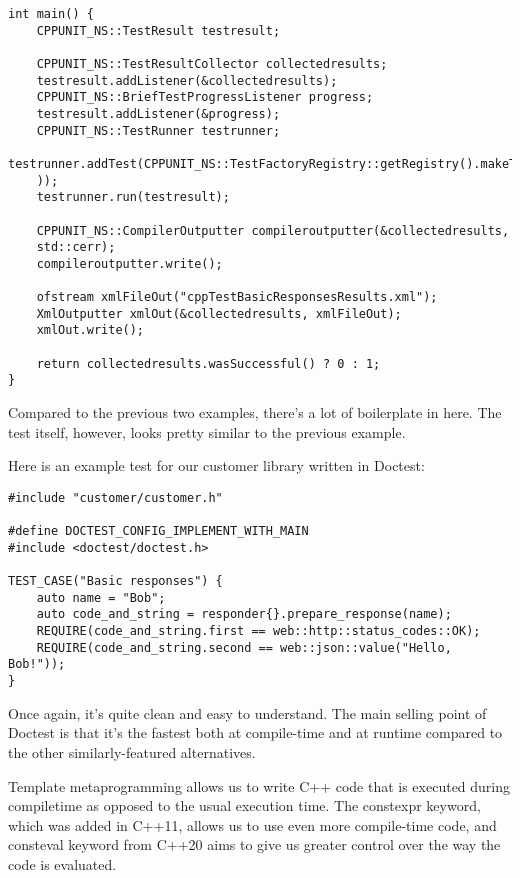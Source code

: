 \begin{lstlisting}[style=styleCXX]
int main() {
	CPPUNIT_NS::TestResult testresult;
	
	CPPUNIT_NS::TestResultCollector collectedresults;
	testresult.addListener(&collectedresults);
	CPPUNIT_NS::BriefTestProgressListener progress;
	testresult.addListener(&progress);
	CPPUNIT_NS::TestRunner testrunner;
	testrunner.addTest(CPPUNIT_NS::TestFactoryRegistry::getRegistry().makeTest(
	));
	testrunner.run(testresult);
	
	CPPUNIT_NS::CompilerOutputter compileroutputter(&collectedresults,
	std::cerr);
	compileroutputter.write();
	
	ofstream xmlFileOut("cppTestBasicResponsesResults.xml");
	XmlOutputter xmlOut(&collectedresults, xmlFileOut);
	xmlOut.write();
	
	return collectedresults.wasSuccessful() ? 0 : 1;
}
\end{lstlisting}

Compared to the previous two examples, there's a lot of boilerplate in here. The test itself, however, looks pretty similar to the previous example.


Here is an example test for our customer library written in Doctest:

\begin{lstlisting}[style=styleCXX]
#include "customer/customer.h"

#define DOCTEST_CONFIG_IMPLEMENT_WITH_MAIN
#include <doctest/doctest.h>

TEST_CASE("Basic responses") {
	auto name = "Bob";
	auto code_and_string = responder{}.prepare_response(name);
	REQUIRE(code_and_string.first == web::http::status_codes::OK);
	REQUIRE(code_and_string.second == web::json::value("Hello, Bob!"));
}
\end{lstlisting}

Once again, it's quite clean and easy to understand. The main selling point of Doctest is that it's the fastest both at compile-time and at runtime compared to the other similarly-featured alternatives.


Template metaprogramming allows us to write C++ code that is executed during compiletime as opposed to the usual execution time. The constexpr keyword, which was added in C++11, allows us to use even more compile-time code, and consteval keyword from C++20 aims to give us greater control over the way the code is evaluated.

